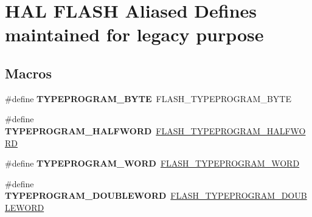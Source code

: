 \hypertarget{group___h_a_l___f_l_a_s_h___aliased___defines}{}\section{H\+AL F\+L\+A\+SH Aliased Defines maintained for legacy purpose}
\label{group___h_a_l___f_l_a_s_h___aliased___defines}
\subsection*{Macros}
\begin{DoxyCompactItemize}
\item 
\mbox{\label{group___h_a_l___f_l_a_s_h___aliased___defines_ga458b1d485bc541d4a9f2196881146026}} 
\#define {\bfseries T\+Y\+P\+E\+P\+R\+O\+G\+R\+A\+M\+\_\+\+B\+Y\+TE}~F\+L\+A\+S\+H\+\_\+\+T\+Y\+P\+E\+P\+R\+O\+G\+R\+A\+M\+\_\+\+B\+Y\+TE
\item 
\mbox{\label{group___h_a_l___f_l_a_s_h___aliased___defines_ga7f3aba0ba4426991096af46fb513eb4a}} 
\#define {\bfseries T\+Y\+P\+E\+P\+R\+O\+G\+R\+A\+M\+\_\+\+H\+A\+L\+F\+W\+O\+RD}~\hyperlink{group___f_l_a_s_h___type___program_ga2b607dfc2efd463a8530e327bc755582}{F\+L\+A\+S\+H\+\_\+\+T\+Y\+P\+E\+P\+R\+O\+G\+R\+A\+M\+\_\+\+H\+A\+L\+F\+W\+O\+RD}
\item 
\mbox{\label{group___h_a_l___f_l_a_s_h___aliased___defines_ga30d98b2839798f48f8a6e0289ab2677a}} 
\#define {\bfseries T\+Y\+P\+E\+P\+R\+O\+G\+R\+A\+M\+\_\+\+W\+O\+RD}~\hyperlink{group___f_l_a_s_h___type___program_gadd25c6821539030ba6711e7c0d586c3e}{F\+L\+A\+S\+H\+\_\+\+T\+Y\+P\+E\+P\+R\+O\+G\+R\+A\+M\+\_\+\+W\+O\+RD}
\item 
\mbox{\label{group___h_a_l___f_l_a_s_h___aliased___defines_ga12da935a6f8f2870015e55ff8aa9a7b0}} 
\#define {\bfseries T\+Y\+P\+E\+P\+R\+O\+G\+R\+A\+M\+\_\+\+D\+O\+U\+B\+L\+E\+W\+O\+RD}~\hyperlink{group___f_l_a_s_h___type___program_gabdc2b0b4d2e66c2be90fafbfbf1e225f}{F\+L\+A\+S\+H\+\_\+\+T\+Y\+P\+E\+P\+R\+O\+G\+R\+A\+M\+\_\+\+D\+O\+U\+B\+L\+E\+W\+O\+RD}
\item 

\end{DoxyCompactItemize}

